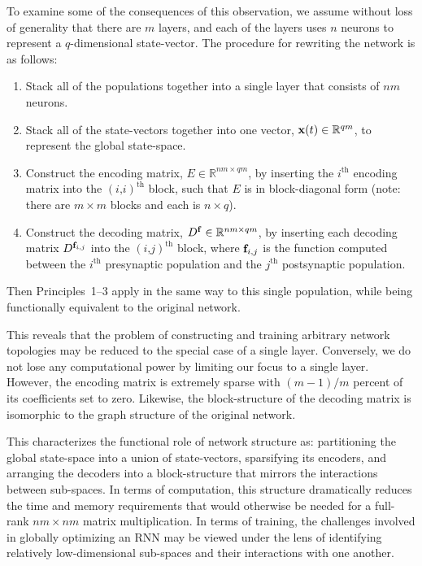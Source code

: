 To examine some of the consequences of this observation, we assume without loss of generality that there are $m$ layers, and each of the layers uses $n$ neurons to represent a $q$-dimensional state-vector.
The procedure for rewriting the network is as follows:
\begin{enumerate}
\item Stack all of the populations together into a single layer that consists of $nm$ neurons. 
\item Stack all of the state-vectors together into one vector, $\mathbf{x}(t) \in \mathbb{R}^{qm}$, to represent the global state-space.
\item Construct the encoding matrix, $E \in \mathbb{R}^{nm \times qm}$, by inserting the $i^\text{th}$ encoding matrix into the $(i\text{,} i)^\text{th}$ block, such that $E$ is in block-diagonal form (note: there are $m \times m$ blocks and each is $n \times q$).
\item Construct the decoding matrix, $D^{\mathbf{f}} \in \mathbb{R}^{nm \times qm}$, by inserting each decoding matrix $D^{\mathbf{f}_{i\text{,}j}}$ into the $(i\text{,} j)^\text{th}$ block, where $\mathbf{f}_{i\text{,}j}$ is the function computed between the $i^\text{th}$ presynaptic population and the $j^\text{th}$ postsynaptic population.
\end{enumerate}
Then Principles~1--3 apply in the same way to this single population, while being functionally equivalent to the original network.

This reveals that the problem of constructing and training arbitrary network topologies may be reduced to the special case of a single layer.
Conversely, we do not lose any computational power by limiting our focus to a single layer.
However, the encoding matrix is extremely sparse with $(m - 1) / m$ percent of its coefficients set to zero.
Likewise, the block-structure of the decoding matrix is isomorphic to the graph structure of the original network.

This characterizes the functional role of network structure as: partitioning the global state-space into a union of state-vectors, sparsifying its encoders, and arranging the decoders into a block-structure that mirrors the interactions between sub-spaces.
In terms of computation, this structure dramatically reduces the time and memory requirements that would otherwise be needed for a full-rank $nm \times nm$ matrix multiplication.
In terms of training, the challenges involved in globally optimizing an RNN may be viewed under the lens of identifying relatively low-dimensional sub-spaces and their interactions with one another.

